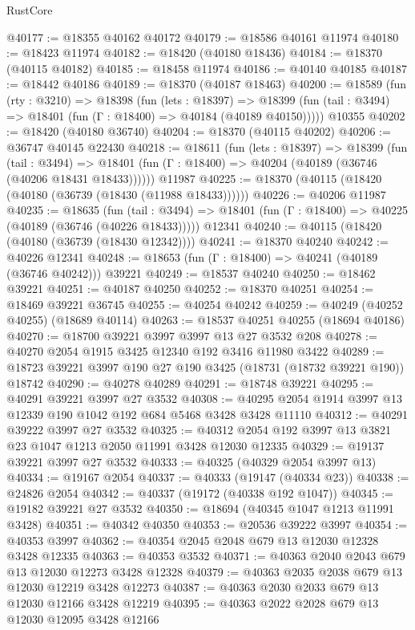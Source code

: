 \begin{lexlean}{RustCore}
\begin{coremodule}
@40177 := @18355 @40162 @40172
@40179 := @18586 @40161 @11974
@40180 := @18423 @11974
@40182 := @18420 (@40180 @18436)
@40184 := @18370 (@40115 @40182)
@40185 := @18458 @11974
@40186 := @40140 @40185
@40187 := @18442 @40186
@40189 := @18370 (@40187 @18463)
@40200 := @18589
    (fun (rty : @3210) =>
    @18398
      (fun (lets : @18397) =>
      @18399 (fun (tail : @3494) => @18401 (fun (Γ : @18400) => @40184 (@40189 @40150)))))
    @10355
@40202 := @18420 (@40180 @36740)
@40204 := @18370 (@40115 @40202)
@40206 := @36747 @40145 @22430
@40218 := @18611
    (fun (lets : @18397) =>
    @18399
      (fun (tail : @3494) =>
      @18401 (fun (Γ : @18400) => @40204 (@40189 (@36746 (@40206 @18431 @18433))))))
    @11987
@40225 := @18370 (@40115 (@18420 (@40180 (@36739 (@18430 (@11988 @18433))))))
@40226 := @40206 @11987
@40235 := @18635
    (fun (tail : @3494) => @18401 (fun (Γ : @18400) => @40225 (@40189 (@36746 (@40226 @18433)))))
    @12341
@40240 := @40115 (@18420 (@40180 (@36739 (@18430 @12342))))
@40241 := @18370 @40240
@40242 := @40226 @12341
@40248 := @18653 (fun (Γ : @18400) => @40241 (@40189 (@36746 @40242))) @39221
@40249 := @18537 @40240
@40250 := @18462 @39221
@40251 := @40187 @40250
@40252 := @18370 @40251
@40254 := @18469 @39221 @36745
@40255 := @40254 @40242
@40259 := @40249 (@40252 @40255) (@18689 @40114)
@40263 := @18537 @40251 @40255 (@18694 @40186)
@40270 := @18700 @39221 @3997 @3997 @13 @27 @3532 @208
@40278 := @40270 @2054 @1915 @3425 @12340 @192 @3416 @11980 @3422
@40289 := @18723 @39221 @3997 @190 @27 @190 @3425 (@18731 (@18732 @39221 @190)) @18742
@40290 := @40278 @40289
@40291 := @18748 @39221
@40295 := @40291 @39221 @3997 @27 @3532
@40308 := @40295 @2054 @1914 @3997 @13 @12339 @190 @1042 @192 @684 @5468 @3428 @3428 @11110
@40312 := @40291 @39222 @3997 @27 @3532
@40325 := @40312 @2054 @192 @3997 @13 @3821 @23 @1047 @1213 @2050 @11991 @3428 @12030 @12335
@40329 := @19137 @39221 @3997 @27 @3532
@40333 := @40325 (@40329 @2054 @3997 @13)
@40334 := @19167 @2054
@40337 := @40333 (@19147 (@40334 @23))
@40338 := @24826 @2054
@40342 := @40337 (@19172 (@40338 @192 @1047))
@40345 := @19182 @39221 @27 @3532
@40350 := @18694 (@40345 @1047 @1213 @11991 @3428)
@40351 := @40342 @40350
@40353 := @20536 @39222 @3997
@40354 := @40353 @3997
@40362 := @40354 @2045 @2048 @679 @13 @12030 @12328 @3428 @12335
@40363 := @40353 @3532
@40371 := @40363 @2040 @2043 @679 @13 @12030 @12273 @3428 @12328
@40379 := @40363 @2035 @2038 @679 @13 @12030 @12219 @3428 @12273
@40387 := @40363 @2030 @2033 @679 @13 @12030 @12166 @3428 @12219
@40395 := @40363 @2022 @2028 @679 @13 @12030 @12095 @3428 @12166

\end{coremodule}
\end{lexlean}
